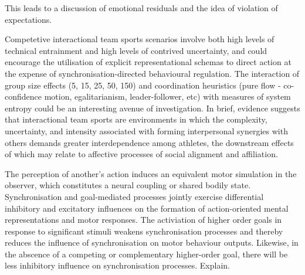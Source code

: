 \documentclass[12pt]{report}
\begin{document}
This leads to a discussion of emotional residuals and the idea of violation of expectations.


Competetive interactional team sports scenarios involve both high levels of technical entrainment and high levels of  contrived uncertainty, and could encourage the utilisation of explicit representational schemas to direct action at the expense of synchronisation-directed behavioural regulation.  The interaction of group size effects (5, 15, 25, 50, 150) and coordination heuristics (pure flow - co-confidence motion, egalitarianism, leader-follower, etc) with measures of system entropy could be an interesting avenue of investigation. In brief, evidence suggests that interactional team sports are environments in which the complexity, uncertainty, and intensity associated with forming interpersonal synergies with others demands greater interdependence among athletes, the downstream effects of which may relate to affective processes of social alignment and affiliation.

The perception of another's action induces an equivalent motor simulation in the observer, which constitutes a neural coupling or shared bodily state. Synchronisation and goal-mediated processes jointly exercise differential inhibitory and excitatory influences on the formation of action-oriented mental representations and motor responses.  The activiation of higher order goals in response to significant stimuli weakens synchronisation processes and thereby reduces the influence of synchronisation on motor behaviour outputs.  Likewise, in the abscence of a competing or complementary higher-order goal, there will be less inhibitory influence on synchronisation processes.
Explain.
\end{document}
